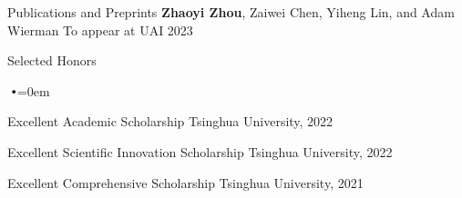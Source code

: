 \documentclass[]{cv}
\begin{document}






\begin{section}{Publications and Preprints}
    {\textbf{Zhaoyi Zhou}, Zaiwei Chen, Yiheng Lin, and Adam Wierman}
    {To appear at UAI 2023}
\end{section}

\begin{section}{Selected Honors}
    \begin{list}{$\vbullet$}{\leftmargin=0em}
        \item Excellent Academic Scholarship \hfill Tsinghua University, 2022
        \vspace{-0.5em}
        \item Excellent Scientific Innovation Scholarship \hfill Tsinghua University, 2022
        \vspace{-0.5em}
        \item Excellent Comprehensive Scholarship \hfill Tsinghua University, 2021
    \end{list}
\end{section}
\end{document}

